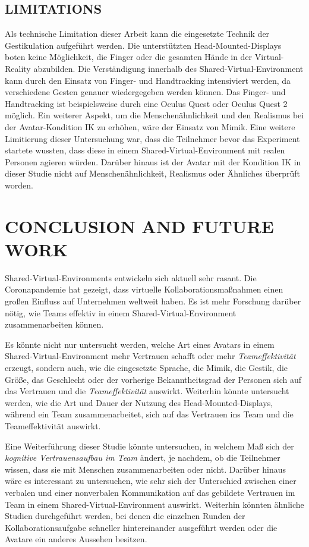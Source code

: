 \documentclass[sigchi]{acmart}
\begin{document}
\subsection{LIMITATIONS}
Als technische Limitation dieser Arbeit kann die eingesetzte Technik der Gestikulation aufgeführt werden. Die unterstützten Head-Mounted-Displays boten keine Möglichkeit, die Finger oder die gesamten Hände in der Virtual-Reality abzubilden. Die Verständigung innerhalb des Shared-Virtual-Environment kann durch den Einsatz von Finger- und Handtracking intensiviert werden, da verschiedene Gesten genauer wiedergegeben werden können. Das Finger- und Handtracking ist beispielsweise durch eine Oculus Quest oder Oculus Quest 2 möglich. Ein weiterer Aspekt, um die Menschenähnlichkeit und den Realismus bei der Avatar-Kondition IK zu erhöhen, wäre der Einsatz von Mimik.
Eine weitere Limitierung dieser Untersuchung war, dass die Teilnehmer bevor das Experiment startete wussten, dass diese in einem Shared-Virtual-Environment mit realen Personen agieren würden. 
Darüber hinaus ist der Avatar mit der Kondition IK in dieser Studie nicht auf Menschenähnlichkeit, Realismus oder Ähnliches überprüft worden. 
\section{CONCLUSION AND FUTURE WORK}
Shared-Virtual-Environments entwickeln sich aktuell sehr rasant. Die Coronapandemie hat gezeigt, dass virtuelle Kollaborationsmaßnahmen einen großen Einfluss auf Unternehmen weltweit haben. Es ist mehr Forschung darüber nötig, wie Teams effektiv in einem Shared-Virtual-Environment zusammenarbeiten können.

Es könnte nicht nur untersucht werden, welche Art eines Avatars in einem Shared-Virtual-Environment mehr Vertrauen schafft oder mehr \textit{Teameffektivität} erzeugt, sondern auch, wie die eingesetzte Sprache, die Mimik, die Gestik, die Größe, das Geschlecht oder der vorherige Bekanntheitsgrad der Personen sich auf das Vertrauen und die \textit{Teameffektivität} auswirkt.
Weiterhin könnte untersucht werden, wie die Art und Dauer der Nutzung des Head-Mounted-Displays, während ein Team zusammenarbeitet, sich auf das Vertrauen ins Team und die Teameffektivität auswirkt.

Eine Weiterführung dieser Studie könnte untersuchen, in welchem Maß sich der \textit{kognitive Vertrauensaufbau im Team} ändert, je nachdem, ob die Teilnehmer wissen, dass sie mit Menschen zusammenarbeiten oder nicht. Darüber hinaus wäre es interessant zu untersuchen, wie sehr sich der Unterschied zwischen einer verbalen und einer nonverbalen Kommunikation auf das gebildete Vertrauen im Team in einem Shared-Virtual-Environment auswirkt.  
Weiterhin könnten ähnliche Studien durchgeführt werden, bei denen die einzelnen Runden der Kollaborationsaufgabe schneller hintereinander ausgeführt werden oder die Avatare ein anderes Aussehen besitzen.
\end{document}
